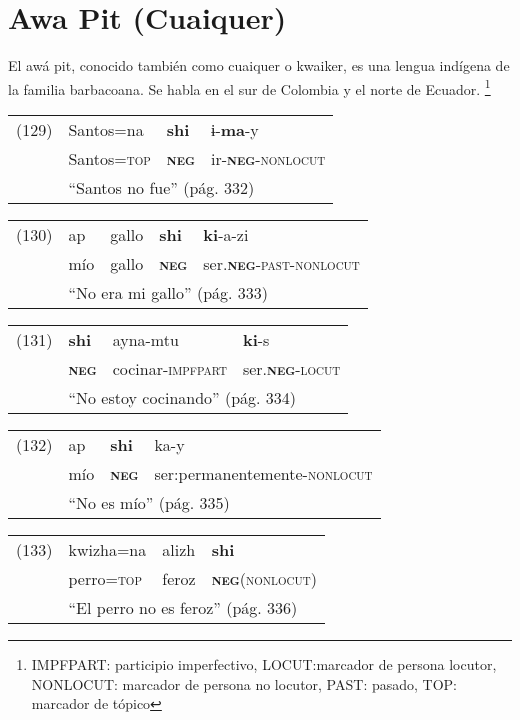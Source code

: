 \section*{Awa Pit (Cuaiquer)}

\noindent El awá pit, conocido también como cuaiquer o kwaiker, es una lengua indígena de la familia barbacoana. Se habla en el sur de Colombia y el norte de Ecuador.
\footnote{IMPFPART: participio imperfectivo, LOCUT:marcador de persona locutor, NONLOCUT: marcador de persona no locutor, PAST: pasado, TOP: marcador de tópico}
\vspace{0.2cm}

{\setmainfont{Charis SIL} 

\begin{tabular}{llll}
(129) & Santos=na & \textbf{shi} & ɨ-\textbf{ma}-y \\
& Santos=\textsc{top} & \textsc{\textbf{neg}} & ir-\textsc{\textbf{neg}-nonlocut} \\
& \multicolumn{3}{l}{``Santos no fue'' (pág. 332)}
\end{tabular} \vspace{0.2cm}

\begin{tabular}{lllll}
(130) & ap & gallo & \textbf{shi} & \textbf{ki}-a-zi \\
& mío & gallo & \textsc{\textbf{neg}} & ser.\textsc{\textbf{neg}-past-nonlocut} \\
& \multicolumn{4}{l}{``No era mi gallo'' (pág. 333)}
\end{tabular} \vspace{0.2cm}

\begin{tabular}{llll}
(131) & \textbf{shi} & ayna-mtu & \textbf{ki}-s \\
& \textsc{\textbf{neg}} & cocinar-\textsc{impfpart} & ser.\textsc{\textbf{neg}-locut} \\
& \multicolumn{3}{l}{``No estoy cocinando'' (pág. 334)}
\end{tabular} \vspace{0.2cm}

\begin{tabular}{llll}
(132) & ap & \textbf{shi} & ka-y \\
& mío & \textsc{\textbf{neg}} & ser:permanentemente-\textsc{nonlocut} \\
& \multicolumn{3}{l}{``No es mío'' (pág. 335)}
\end{tabular} \vspace{0.2cm}

\begin{tabular}{llll}
(133) & kwizha=na & alizh & \textbf{shi} \\
& perro=\textsc{top} & feroz & \textsc{\textbf{neg}(nonlocut)} \\
& \multicolumn{3}{l}{``El perro no es feroz'' (pág. 336)}
\end{tabular} \vspace{0.2cm}

}

